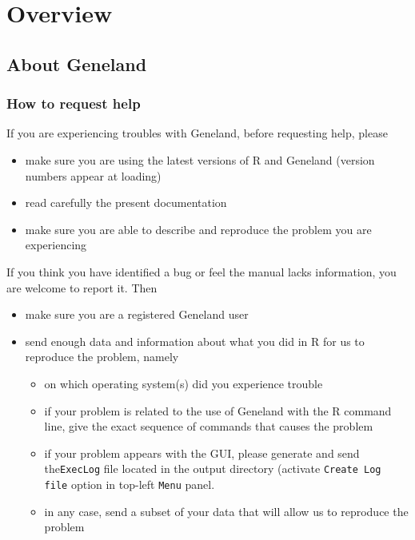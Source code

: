 \documentclass[a4paper,10pt]{article}
\begin{document}
\setlength{\arrayrulewidth}{.5pt}
\newpage



\tableofcontents

\newpage


\section{Overview}
\subsection{About {\sc Geneland}}

\subsubsection{How to request help}
If you are experiencing troubles with {\sc Geneland}, before requesting help, please 
\begin{itemize}
\item make sure you are using the latest  versions of R and {\sc Geneland} (version numbers appear at loading)
\item read carefully the present documentation 
\item make sure you are able to describe and reproduce the problem you are experiencing
\end{itemize}

If you think you have identified a bug or feel the manual lacks information, you are welcome to report it. 
Then
\begin{itemize}

\item make sure you are a registered {\sc Geneland} user
\item  send enough data and information about what you did in R  for us to reproduce the problem, namely
  \begin{itemize}
  \item on which operating system(s) did you experience trouble 
  \item if your problem is related to the use of {\sc Geneland} with the R command line, 
    give the exact sequence of commands that causes the problem
  \item  if your problem appears with the GUI, please generate and send the\texttt{ExecLog} file  
    located in the output directory (activate \texttt{Create Log file} option in top-left \texttt{Menu} panel.
  \item in any case, send a subset of your data that will allow us to reproduce the problem 
  \end{itemize}
\end{itemize}
\end{document}
